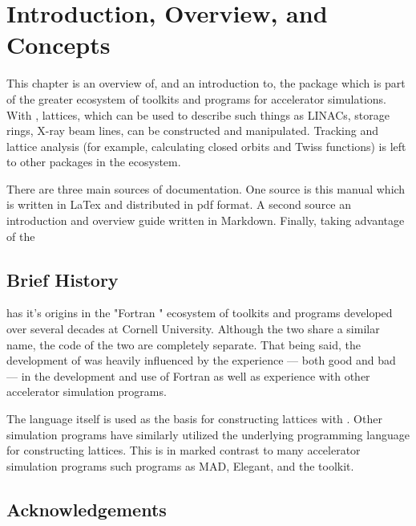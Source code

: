 \chapter{Introduction, Overview, and Concepts}

This chapter is an overview of, and an introduction to, the \accellat package which is part of the
greater \bmadjl ecosystem of toolkits and programs for accelerator simulations. With \accellat,
lattices, which can be used to describe such
things as LINACs, storage rings, X-ray beam lines,
can be constructed and manipulated. Tracking and lattice analysis (for example, calculating
closed orbits and Twiss functions) is left to other packages in the \bmadjl ecosystem.

There are three main sources of documentation. One source is this manual which is written in LaTex
and distributed in pdf format. A second source an introduction and overview guide written in Markdown.
Finally, taking advantage of the 

\section{Brief History}

\bmadjl has it's origins in the "Fortran \bmad" ecosystem of toolkits and programs developed over several
decades at Cornell University. Although the two share a similar name, the code of the two are
completely separate. That being said, the development of \accellat was heavily influenced by the 
experience --- both good and bad --- in the development and use of Fortran \bmad as well as experience
with other accelerator simulation programs.

The \julia language itself is used as the basis for constructing lattices with \accellat. 
Other simulation programs
have similarly utilized the underlying programming language for constructing 
lattices\cite{Appleby:Merlin2020,Iadarola:Xsuite2023}. This is in marked contrast to many accelerator
simulation programs such programs as MAD\cite{Grote:MAD1989}, Elegant\cite{Borland:Elegant2000}, and the 
\bmad toolkit\cite{Sagan:Bmad2006}. 

\section{Acknowledgements}

